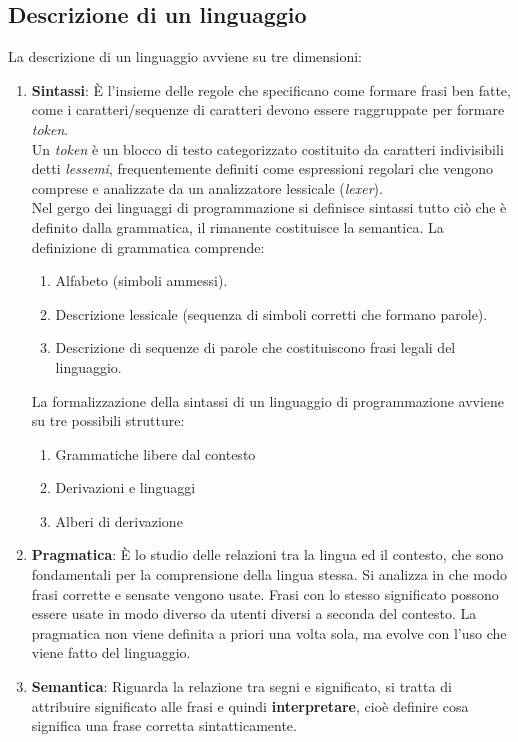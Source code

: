 \documentclass[a4paper, 10pt]{article}
\begin{document}
	\subsection{Descrizione di un linguaggio}
	La descrizione di un linguaggio avviene su tre dimensioni:
	\begin{enumerate}
		\item \textbf{Sintassi}:
		È l'insieme delle regole che specificano come formare frasi ben fatte, come i caratteri/sequenze di caratteri devono essere raggruppate per formare \textit{token}. \\
		Un \textit{token} è un blocco di testo categorizzato costituito da caratteri indivisibili detti \textit{lessemi}, frequentemente definiti come espressioni regolari che vengono comprese e analizzate da un analizzatore lessicale (\textit{lexer}).\\
		Nel gergo dei linguaggi di programmazione si definisce sintassi tutto ciò che è definito dalla grammatica, il rimanente costituisce la semantica.
		La definizione di grammatica comprende:
		\begin{enumerate}
			\item Alfabeto (simboli ammessi).
			\item Descrizione lessicale (sequenza di simboli corretti che formano parole).
			\item Descrizione di sequenze di parole che costituiscono frasi legali del linguaggio.
		\end{enumerate}
		La formalizzazione della sintassi di un linguaggio di programmazione avviene su tre possibili strutture:
		\begin{enumerate}
			\item Grammatiche libere dal contesto
			\item Derivazioni e linguaggi
			\item Alberi di derivazione
		\end{enumerate}
		\item \textbf{Pragmatica}: 
		È lo studio delle relazioni tra la lingua ed il contesto, che sono fondamentali per la comprensione della lingua stessa. Si analizza in che modo frasi corrette e sensate vengono usate.
		Frasi con lo stesso significato possono essere usate in modo diverso da utenti diversi a seconda del contesto.
		La pragmatica non viene definita a priori una volta sola, ma evolve con l'uso che viene fatto del linguaggio.
		\item \textbf{Semantica}:
		Riguarda la relazione tra segni e significato, si tratta di attribuire significato alle frasi e quindi \textbf{interpretare}, cioè definire cosa significa una frase corretta sintatticamente.

\end{enumerate}
\end{document}
